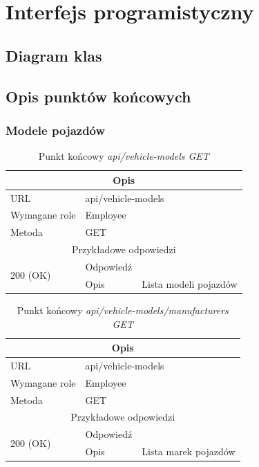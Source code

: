 \documentclass[eng,printmode,openany]{mgr}
\begin{document}
\section{Interfejs programistyczny}
\subsection{Diagram klas}

\subsection{Opis punktów końcowych}
\subsubsection{Modele pojazdów}
\begin{table}[]
	\caption{Punkt końcowy \textit{api/vehicle-models GET}}
	\begin{tabularx}{\textwidth}{|l|l|X|}
		\hline
		\multicolumn{3}{|c|}{Opis}                         						\\ \hline
		URL                       & \multicolumn{2}{l|}{api/vehicle-models} 	\\ \hline
		Wymagane role             & \multicolumn{2}{l|}{Employee} \\ \hline
		Metoda                    & \multicolumn{2}{l|}{GET} 					\\ \hline
		\multicolumn{3}{|c|}{ Przykładowe odpowiedzi}                   		\\ \hline
		\multirow{2}{*}{200 (OK)} 			& Odpowiedź     &        \\ \cline{2-3} 
											& Opis         	& Lista modeli pojazdów       											\\ \hline
	\end{tabularx}
\end{table}

\begin{table}[]
	\caption{Punkt końcowy \textit{api/vehicle-models/manufacturers GET}}
	\begin{tabularx}{\textwidth}{|l|l|X|}
		\hline
		\multicolumn{3}{|c|}{Opis}                         						\\ \hline
		URL                       & \multicolumn{2}{l|}{api/vehicle-models} 	\\ \hline
		Wymagane role             & \multicolumn{2}{l|}{Employee} \\ \hline
		Metoda                    & \multicolumn{2}{l|}{GET} 					\\ \hline
		\multicolumn{3}{|c|}{ Przykładowe odpowiedzi}                   		\\ \hline
		\multirow{2}{*}{200 (OK)} 			& Odpowiedź     &        \\ \cline{2-3} 
											& Opis         	& Lista marek pojazdów       											\\ \hline
	\end{tabularx}
\end{table}
\end{document}
